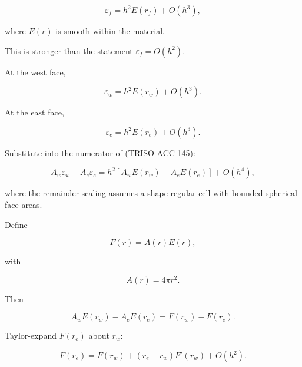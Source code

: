 \documentclass[11pt,a4paper]{article}
\begin{document}
\begin{equation}
\boxed{
\varepsilon_f
=
h^2E(r_f)
+
O(h^3),
}
\tag{TRISO-ACC-149}
\label{eq:triso-acc-149}
\end{equation}

where $E(r)$ is smooth within the material.

This is stronger than the statement $\varepsilon_f=O(h^2)$.

At the west face,

\begin{equation}
\varepsilon_w
=
h^2E(r_w)
+
O(h^3).
\tag{TRISO-ACC-150}
\label{eq:triso-acc-150}
\end{equation}

At the east face,

\begin{equation}
\varepsilon_e
=
h^2E(r_e)
+
O(h^3).
\tag{TRISO-ACC-151}
\label{eq:triso-acc-151}
\end{equation}

Substitute into the numerator of (TRISO-ACC-145):

\begin{equation}
A_w\varepsilon_w-A_e\varepsilon_e
=
h^2
\left[
A_wE(r_w)-A_eE(r_e)
\right]
+
O(h^4),
\tag{TRISO-ACC-152}
\label{eq:triso-acc-152}
\end{equation}

where the remainder scaling assumes a shape-regular cell with bounded spherical face areas.

Define

\begin{equation}
F(r)=A(r)E(r),
\tag{TRISO-ACC-153}
\label{eq:triso-acc-153}
\end{equation}

with

\begin{equation}
A(r)=4\pi r^2.
\tag{TRISO-ACC-154}
\label{eq:triso-acc-154}
\end{equation}

Then

\begin{equation}
A_wE(r_w)-A_eE(r_e)
=
F(r_w)-F(r_e).
\tag{TRISO-ACC-155}
\label{eq:triso-acc-155}
\end{equation}

Taylor-expand $F(r_e)$ about $r_w$:

\begin{equation}
F(r_e)
=
F(r_w)
+
(r_e-r_w)F'(r_w)
+
O(h^2).
\tag{TRISO-ACC-156}
\label{eq:triso-acc-156}
\end{equation}
\end{document}
